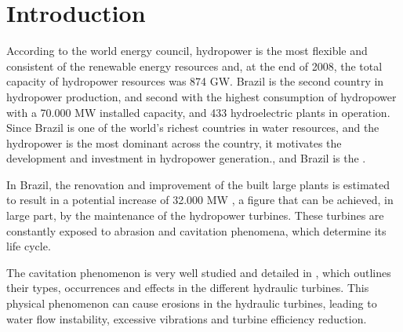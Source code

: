 \section{Introduction}
According to the world energy council, hydropower is the most flexible and
consistent of the renewable energy resources and, at the end of 2008, the total
capacity of hydropower resources was 874 GW. Brazil is the second
country in hydropower production, and second with the highest
consumption of hydropower with a 70.000 MW installed capacity, and 433
hydroelectric plants in operation. Since Brazil is one of the world's richest
countries in water resources, and the hydropower is the most dominant across
the country, it motivates the development and investment in hydropower
generation., and Brazil is the .


In Brazil, the renovation and improvement of the built large plants is estimated
to result in a potential increase of 32.000 MW \citep{goldemberg2007energia}, a
figure that can be achieved, in large part, by the maintenance of the
hydropower turbines. These turbines are constantly exposed to abrasion and
cavitation phenomena, which determine its life cycle.

The cavitation phenomenon is very well studied and detailed in
\cite{escaler2006detection}, which outlines their types, occurrences and
effects in the different hydraulic turbines. This physical phenomenon can cause
erosions in the hydraulic turbines, leading to water flow instability,
excessive vibrations and turbine efficiency reduction.

